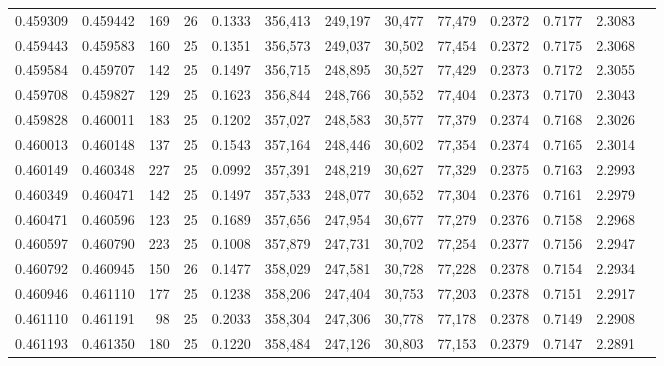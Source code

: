 \begin{tabular}{rrrrrrrrrrrrr}
0.459309 & 0.459442 &   169 &  26 &                                     0.1333 & 356,413 & 249,197 &  30,477 &  77,479 & 0.2372 & 0.7177 & 2.3083 \\
0.459443 & 0.459583 &   160 &  25 &                                     0.1351 & 356,573 & 249,037 &  30,502 &  77,454 & 0.2372 & 0.7175 & 2.3068 \\
0.459584 & 0.459707 &   142 &  25 &                                     0.1497 & 356,715 & 248,895 &  30,527 &  77,429 & 0.2373 & 0.7172 & 2.3055 \\
0.459708 & 0.459827 &   129 &  25 &                                     0.1623 & 356,844 & 248,766 &  30,552 &  77,404 & 0.2373 & 0.7170 & 2.3043 \\
0.459828 & 0.460011 &   183 &  25 &                                     0.1202 & 357,027 & 248,583 &  30,577 &  77,379 & 0.2374 & 0.7168 & 2.3026 \\
0.460013 & 0.460148 &   137 &  25 &                                     0.1543 & 357,164 & 248,446 &  30,602 &  77,354 & 0.2374 & 0.7165 & 2.3014 \\
0.460149 & 0.460348 &   227 &  25 &                                     0.0992 & 357,391 & 248,219 &  30,627 &  77,329 & 0.2375 & 0.7163 & 2.2993 \\
0.460349 & 0.460471 &   142 &  25 &                                     0.1497 & 357,533 & 248,077 &  30,652 &  77,304 & 0.2376 & 0.7161 & 2.2979 \\
0.460471 & 0.460596 &   123 &  25 &                                     0.1689 & 357,656 & 247,954 &  30,677 &  77,279 & 0.2376 & 0.7158 & 2.2968 \\
0.460597 & 0.460790 &   223 &  25 &                                     0.1008 & 357,879 & 247,731 &  30,702 &  77,254 & 0.2377 & 0.7156 & 2.2947 \\
0.460792 & 0.460945 &   150 &  26 &                                     0.1477 & 358,029 & 247,581 &  30,728 &  77,228 & 0.2378 & 0.7154 & 2.2934 \\
0.460946 & 0.461110 &   177 &  25 &                                     0.1238 & 358,206 & 247,404 &  30,753 &  77,203 & 0.2378 & 0.7151 & 2.2917 \\
0.461110 & 0.461191 &    98 &  25 &                                     0.2033 & 358,304 & 247,306 &  30,778 &  77,178 & 0.2378 & 0.7149 & 2.2908 \\
0.461193 & 0.461350 &   180 &  25 &                                     0.1220 & 358,484 & 247,126 &  30,803 &  77,153 & 0.2379 & 0.7147 & 2.2891 \\

\end{tabular}
